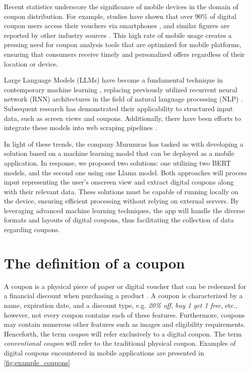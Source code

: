 \documentclass[licencjacka,en]{pracamgr}
\begin{document}
Recent statistics underscore the significance of mobile devices in the domain of coupon distribution. For example, studies have shown that over 90\% of digital coupon users access their vouchers via smartphones \cite{emarketer_coupon_stats}, and similar figures are reported by other industry sources \cite{coupon_stats_2}. This high rate of mobile usage creates a pressing need for coupon analysis tools that are optimized for mobile platforms, ensuring that consumers receive timely and personalized offers regardless of their location or device.

Large Language Models (LLMs) have become a fundamental technique in contemporary machine learning \cite{LLM-popularity}, replacing previously utilized recurrent neural network (RNN) architectures in the field of natural language processing (NLP) \cite{li2024}. Subsequent research \cite{sui2024} has demonstrated their applicability to structured input data, such as screen views and coupons. Additionally, there have been efforts to integrate these models into web scraping pipelines \cite{scapegraph_repo}. 

In light of these trends, the company Murmuras has tasked us with developing a solution based on a machine learning model that can be deployed as a mobile application. In response, we proposed two solutions: one utilizing two BERT \cite{BERT_intro} models, and the second one using one Llama model. Both approaches will process input representing the user's onscreen view and extract digital coupons along with their relevant data. Thess solutions must be capable of running locally on the device, ensuring efficient processing without relying on external servers. By leveraging advanced machine learning techniques, the app will handle the diverse formats and layouts of digital coupons, thus facilitating the collection of data regarding coupons.

\section{The definition of a coupon} 
A coupon is a physical piece of paper or digital voucher that can be redeemed for a financial discount when purchasing a product \cite{coupon_definition}. A coupon is characterized by a name, expiration date, and a discount type, e.g. \emph{20\% off}, \emph{buy 1 get 1 free}, etc., however, not every coupon contains each of these features. Furthermore, coupons may contain numerous other features such as images and eligibility requirements. Henceforth, the term \emph{coupon} will refer exclusively to a digital coupon. The term \emph{conventional coupon} will refer to the traditional physical coupon. Examples of digital coupons encountered in mobile applications are presented in \ref{fig:example_coupons}
\end{document}

